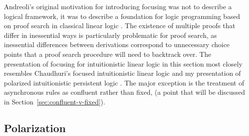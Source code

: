 Andreoli's original motivation for introducing focusing was not to
describe a logical framework, it was to describe a foundation for
logic programming based on proof search in classical linear logic
\cite{andreoli92logic}. The existence of multiple proofs that differ
in inessential ways is particularly problematic for proof search, as
inessential differences between derivations correspond to unnecessary
choice points that a proof search procedure will need to backtrack
over. The presentation of focusing for intuitionistic linear logic in
this section most closely resembles Chaudhuri's focused intuitionistic
linear logic \cite{chaudhuri06focused} and my presentation of
polarized intuitionistic persistent logic
\cite{simmons11structural}. The major exception is the treatment of
asynchronous rules as confluent rather than fixed, (a point that will
be discussed in Section~\ref{sec:confluent-v-fixed}).

\subsection{Polarization}
\label{sec:linpolar}

